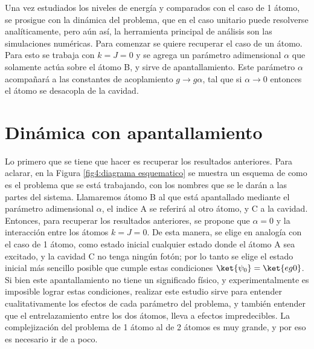 Una vez estudiados los niveles de energía y comparados con el caso de 1 átomo, se prosigue con la dinámica del problema, que en el caso unitario puede resolverse analíticamente, pero a\'un así, la herramienta principal de análisis son las simulaciones numéricas.
Para comenzar se quiere recuperar el caso de un átomo. Para esto se trabaja con $k=J=0$ y se agrega un parámetro adimensional $\alpha$ que solamente actúa sobre el átomo B, y sirve de apantallamiento. Este parámetro $\alpha$ acompañará a las constantes de acoplamiento $g\rightarrow g\alpha$, tal que si $\alpha \rightarrow 0$ entonces el átomo se desacopla de la cavidad. 

\section{Dinámica con apantallamiento}
\label{sec4:dinamica apantallamiento}
Lo primero que se tiene que hacer es recuperar los resultados anteriores. Para aclarar, en la Figura \ref{fig4:diagrama esquematico} se muestra un esquema de como es el problema que se está trabajando, con los nombres que se le darán a las partes del sistema. Llamaremos átomo B al que está apantallado mediante el parámetro adimensional $\alpha$, el indice A se referirá al otro átomo, y C a la cavidad. Entonces, para recuperar los resultados anteriores, se propone que $\alpha=0$ y la interacción entre los átomos $k=J=0$. De esta manera, se elige en analogía con el caso de 1 átomo, como estado inicial cualquier estado donde el átomo A sea excitado, y la cavidad C no tenga ningún fotón; por lo tanto se elige el estado inicial más sencillo posible que cumple estas condiciones $\ket{\psi_0}=\ket{eg0}$. Si bien este apantallamiento no tiene un significado físico, y experimentalmente es imposible lograr estas condiciones, realizar este estudio sirve para entender cualitativamente los efectos de cada parámetro del problema, y también entender que el entrelazamiento entre los dos átomos, lleva a efectos impredecibles. La complejización del problema de 1 átomo al de 2 átomos es muy grande, y por eso es necesario ir de a poco.
